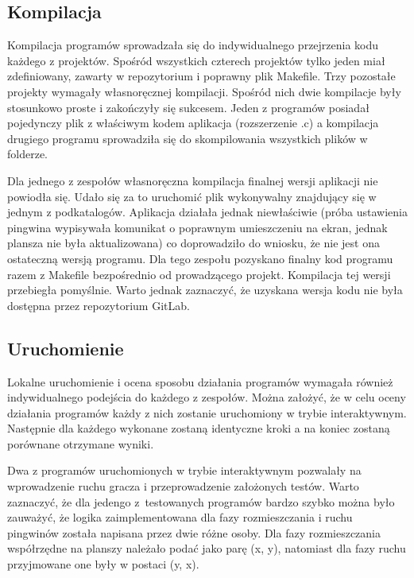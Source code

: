 \subsection{Kompilacja}

Kompilacja programów sprowadzała się do indywidualnego przejrzenia kodu każdego z projektów.
Spośród wszystkich czterech projektów tylko jeden miał zdefiniowany, zawarty w repozytorium i poprawny plik Makefile.
Trzy pozostałe projekty wymagały własnoręcznej kompilacji.
Spośród nich dwie kompilacje były stosunkowo proste i zakończyły się sukcesem.
Jeden z programów posiadał pojedynczy plik z właściwym kodem aplikacja (rozszerzenie .c) a kompilacja drugiego programu sprowadziła się do skompilowania wszystkich plików w folderze.

Dla jednego z zespołów własnoręczna kompilacja finalnej wersji aplikacji nie powiodła się.
Udało się za to uruchomić plik wykonywalny znajdujący się w jednym z podkatalogów.
Aplikacja działała jednak niewłaściwie (próba ustawienia pingwina wypisywała komunikat o poprawnym umieszczeniu na ekran, jednak plansza nie była aktualizowana) co doprowadziło do wniosku, że nie jest ona ostateczną wersją programu.
Dla tego zespołu pozyskano finalny kod programu razem z Makefile bezpośrednio od prowadzącego projekt.
Kompilacja tej wersji przebiegła pomyślnie.
Warto jednak zaznaczyć, że uzyskana wersja kodu nie była dostępna przez repozytorium GitLab.

\subsection{Uruchomienie}

Lokalne uruchomienie i ocena sposobu działania programów wymagała również indywidualnego podejścia do każdego z zespołów.
Można założyć, że w celu oceny działania programów każdy z nich zostanie uruchomiony w trybie interaktywnym.
Następnie dla każdego wykonane zostaną identyczne kroki a na koniec zostaną porównane otrzymane wyniki.

Dwa z programów uruchomionych w trybie interaktywnym pozwalały na wprowadzenie ruchu gracza i przeprowadzenie założonych testów.
Warto zaznaczyć, że dla jedengo z~testowanych programów bardzo szybko można było zauważyć, że logika zaimplementowana dla fazy rozmieszczania i ruchu pingwinów została napisana przez dwie różne osoby.
Dla fazy rozmieszczania współrzędne na planszy należało podać jako parę (x, y), natomiast dla fazy ruchu przyjmowane one były w postaci (y, x).

